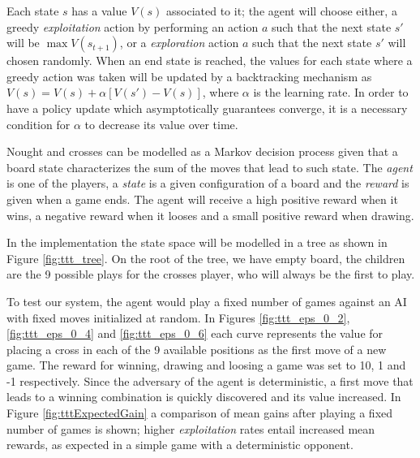 \documentclass[12pt]{article}
\begin{document}
Each state $s$ has a value $V(s)$ associated to it; the agent will choose either, a greedy \emph{exploitation} action by performing an action $a$ such that the next state $s'$  will be $\max V(s_{t + 1})$, or a \emph{exploration} action $a$ such that the next state $s'$  will chosen randomly.
When an end state is reached, the values for each state where a greedy action was taken will be updated by a backtracking mechanism as $V(s) = V(s) + \alpha \left[ V(s') - V(s) \right]$, where $\alpha$ is the learning rate.
In order to have a policy update which asymptotically guarantees converge, it is a necessary condition for $\alpha$ to decrease its value over time.

Nought and crosses can be modelled as a Markov decision process given that a board state characterizes the sum of the moves that lead to such state.
The \emph{agent} is one of the players, a \emph{state} is a given configuration of a board and the \emph{reward} is given when a game ends.
The agent will receive a high positive reward when it wins, a negative reward when it looses and a small positive reward when drawing.

In the implementation the state space will be modelled in a tree as shown in Figure \ref{fig:ttt_tree}.
On the root of the tree, we have empty board, the children are the 9 possible plays for the crosses player, who will always be the first to play.

To test our system, the agent would play a fixed number of games against an AI with fixed moves initialized at random.
In Figures \ref{fig:ttt_eps_0_2}, \ref{fig:ttt_eps_0_4} and \ref{fig:ttt_eps_0_6} each curve represents the value for placing a cross in each of the 9 available positions as the first move of a new game.
The reward for winning, drawing and loosing a game was set to 10, 1 and -1 respectively.
Since the adversary of the agent is deterministic, a first move that leads to a winning combination is quickly discovered and its value increased. 
In Figure \ref{fig:tttExpectedGain} a comparison of mean gains after playing a fixed number of games is shown; higher \emph{exploitation} rates entail increased mean rewards, as expected in a simple game with a deterministic opponent.
\end{document}
